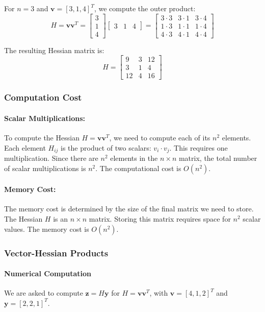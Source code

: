 \documentclass{article}
\begin{document}
For $n=3$ and $\mathbf{v} = [3, 1, 4]^T$, we compute the outer product:
\[ H = \mathbf{v}\mathbf{v}^T = \begin{bmatrix} 3 \\ 1 \\ 4 \end{bmatrix} \begin{bmatrix} 3 & 1 & 4 \end{bmatrix} = \begin{bmatrix} 3 \cdot 3 & 3 \cdot 1 & 3 \cdot 4 \\ 1 \cdot 3 & 1 \cdot 1 & 1 \cdot 4 \\ 4 \cdot 3 & 4 \cdot 1 & 4 \cdot 4 \end{bmatrix} \]

The resulting Hessian matrix is:
\[ H = \begin{bmatrix} 9 & 3 & 12 \\ 3 & 1 & 4 \\ 12 & 4 & 16 \end{bmatrix} \]

\subsubsection*{Computation Cost}

\paragraph{Scalar Multiplications:}
To compute the Hessian $H = \mathbf{v}\mathbf{v}^T$, we need to compute each of its $n^2$ elements. Each element $H_{ij}$ is the product of two scalars: $v_i \cdot v_j$. This requires one multiplication.
Since there are $n^2$ elements in the $n \times n$ matrix, the total number of scalar multiplications is $n^2$.
The computational cost is $O(n^2)$.

\paragraph{Memory Cost:}
The memory cost is determined by the size of the final matrix we need to store. The Hessian $H$ is an $n \times n$ matrix.
Storing this matrix requires space for $n^2$ scalar values.
The memory cost is $O(n^2)$.

\subsubsection{Vector-Hessian Products}

\paragraph{Numerical Computation}
We are asked to compute $\mathbf{z} = H\mathbf{y}$ for $H = \mathbf{v}\mathbf{v}^T$, with $\mathbf{v} = [4, 1, 2]^T$ and $\mathbf{y} = [2, 2, 1]^T$.
\end{document}
